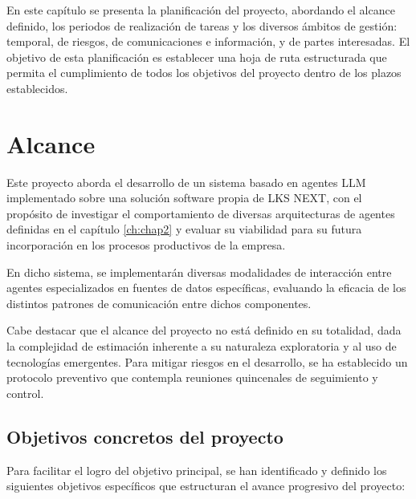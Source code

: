 

En este capítulo se presenta la planificación del proyecto, abordando el alcance definido, los periodos de realización de tareas y los diversos ámbitos de gestión: temporal, de riesgos, de comunicaciones e información, y de partes interesadas. El objetivo de esta planificación es establecer una hoja de ruta estructurada que permita el cumplimiento de todos los objetivos del proyecto dentro de los plazos establecidos.

\section{Alcance}

Este proyecto aborda el desarrollo de un sistema basado en agentes LLM implementado sobre una solución software propia de LKS NEXT, con el propósito de investigar el comportamiento de diversas arquitecturas de agentes definidas en el capítulo \ref{ch:chap2} y evaluar su viabilidad para su futura incorporación en los procesos productivos de la empresa.

En dicho sistema, se implementarán diversas modalidades de interacción entre agentes especializados en fuentes de datos específicas, evaluando la eficacia de los distintos patrones de comunicación entre dichos componentes.

Cabe destacar que el alcance del proyecto no está definido en su totalidad, dada la complejidad de estimación inherente a su naturaleza exploratoria y al uso de tecnologías emergentes. Para mitigar riesgos en el desarrollo, se ha establecido un protocolo preventivo que contempla reuniones quincenales de seguimiento y control.

\subsection{Objetivos concretos del proyecto}
\label{chap3:objetivos}

Para facilitar el logro del objetivo principal, se han identificado y definido los siguientes objetivos específicos que estructuran el avance progresivo del proyecto:

